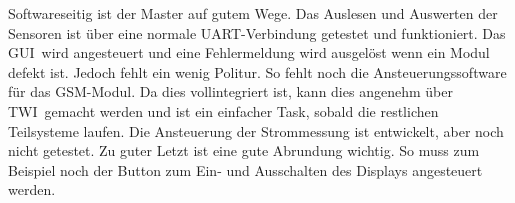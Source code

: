 Softwareseitig  ist der  Master auf  gutem Wege.   Das Auslesen  und Auswerten
der   Sensoren  ist   \"uber   eine  normale   UART-Verbindung  getestet   und
funktioniert. Das   GUI wird   angesteuert   und  eine   Fehlermeldung   wird
ausgel\"ost wenn  ein Modul  defekt ist.  Jedoch  fehlt ein  wenig Politur. So
fehlt   noch   die   Ansteuerungssoftware   f\"ur   das   GSM-Modul. Da   dies
vollintegriert ist, kann dies angenehm  \"uber TWI gemacht werden und ist ein
einfacher Task, sobald die restlichen Teilsysteme laufen.  Die Ansteuerung der
Strommessung ist  entwickelt, aber  noch nicht getestet.   Zu guter  Letzt ist
eine gute Abrundung wichtig. So muss zum Beispiel noch der Button zum Ein- und
Ausschalten des Displays angesteuert werden.
